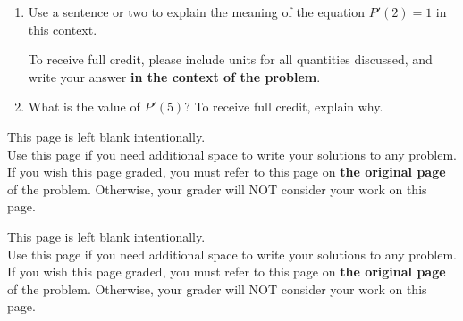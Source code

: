 \documentclass[11pt]{article}
\begin{document}
\begin{enumerate}
\begin{enumerate}
    \item Use a sentence or two to explain the meaning of the equation $P'(2)=1$ in this context. 

    To receive full credit, please include units for all quantities discussed, and write your answer \textbf{in the context of the problem}.
        \vfill

    \item What is the value of $P'(5)$? To receive full credit, explain why.

    \vfill
\end{enumerate}





\newpage

This page is left blank intentionally.\\

Use this page if you need additional space to write your solutions to any problem. \\

If you wish this page graded, you must refer to this page on \textbf{the original page} of the problem. Otherwise, your grader will NOT consider your work on this page.

\newpage

This page is left blank intentionally.\\

Use this page if you need additional space to write your solutions to any problem. \\

If you wish this page graded, you must refer to this page on \textbf{the original page} of the problem. Otherwise, your grader will NOT consider your work on this page.

\end{enumerate}
\end{document}
